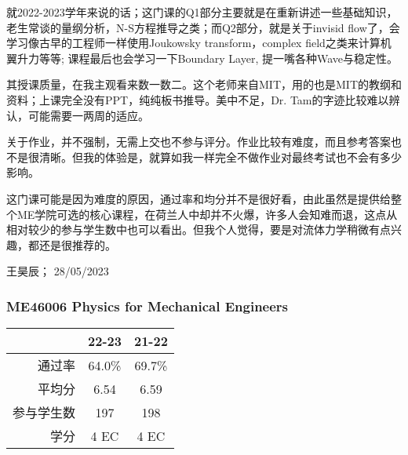 就2022-2023学年来说的话；这门课的Q1部分主要就是在重新讲述一些基础知识，老生常谈的量纲分析，N-S方程推导之类；而Q2部分，就是关于invisid flow了，会学习像古早的工程师一样使用Joukowsky transform，complex field之类来计算机翼升力等等; 课程最后也会学习一下Boundary Layer, 提一嘴各种Wave与稳定性。

其授课质量，在我主观看来数一数二。这个老师来自MIT，用的也是MIT的教纲和资料；上课完全没有PPT，纯纯板书推导。美中不足，Dr. Tam的字迹比较难以辨认，可能需要一两周的适应。

关于作业，并不强制，无需上交也不参与评分。作业比较有难度，而且参考答案也不是很清晰。但我的体验是，就算如我一样完全不做作业对最终考试也不会有多少影响。

这门课可能是因为难度的原因，通过率和均分并不是很好看，由此虽然是提供给整个ME学院可选的核心课程，在荷兰人中却并不火爆，许多人会知难而退，这点从相对较少的参与学生数中也可以看出。但我个人觉得，要是对流体力学稍微有点兴趣，都还是很推荐的。

\begin{flushright}
王昊辰； 28/05/2023
\end{flushright}



\subsubsection{ME46006 Physics for Mechanical Engineers}
\begin{minipage}{0.45\textwidth}
\centering
{}
\end{minipage}%
\begin{minipage}{0.45\textwidth}
\raggedleft
\begin{tabular}{r|c|c}
\textbf{ } & \textbf{22-23} & \textbf{21-22}\\ \hline
通过率 & 64.0\% & 69.7\%\\ 
平均分 & 6.54 & 6.59\\ 
参与学生数 & 197 & 198\\ 
学分 & 4 EC & 4 EC\\
\end{tabular}
\end{minipage}\\

